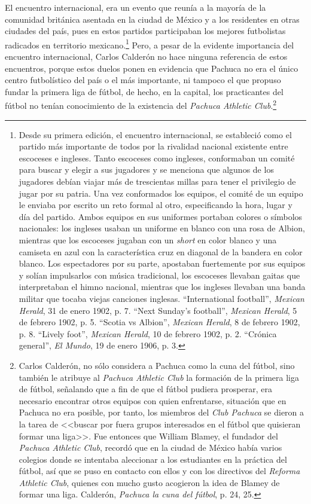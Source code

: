 \documentclass[11pt,a5paper,twoside]{book} %
\begin{document}
El encuentro internacional, era un evento que reunía a la mayoría de la comunidad británica asentada en la ciudad de México y a los residentes en otras ciudades del país, pues en estos partidos participaban los mejores futbolistas radicados en territorio mexicano.\footnote{Desde su primera edición, el encuentro internacional, se estableció como el partido más importante de todos por la rivalidad nacional existente entre escoceses e ingleses. Tanto escoceses como ingleses, conformaban un comité para buscar y elegir a sus jugadores y se menciona que algunos de los jugadores debían viajar más de trescientas millas para tener el privilegio de jugar por su patria. Una vez conformados los equipos, el comité de un equipo le enviaba por escrito un reto formal al otro, especificando la hora, lugar y día del partido. Ambos equipos en sus uniformes portaban colores o símbolos nacionales: los ingleses usaban un uniforme en blanco con una rosa de Albion, mientras que los escoceses jugaban con un \emph{short} en color blanco y una camiseta en azul con la característica cruz en diagonal de la bandera en color blanco. Los espectadores por su parte, apostaban fuertemente por sus equipos y solían impulsarlos con música tradicional, los escoceses llevaban gaitas que interpretaban el himno nacional, mientras que los ingleses llevaban una banda militar que tocaba viejas canciones inglesas. ``International football'', \emph{Mexican Herald}, 31 de enero 1902, p. 7. ``Next Sunday’s football'', \emph{Mexican Herald}, 5 de febrero 1902, p. 5. ``Scotia vs Albion'', \emph{Mexican Herald}, 8 de febrero 1902, p. 8. ``Lively foot'', \emph{Mexican Herald}, 10 de febrero 1902, p. 2. ``Crónica general'', \emph{El Mundo}, 19 de enero 1906, p. 3.} Pero, a pesar de la evidente importancia del encuentro internacional, Carlos Calderón no hace ninguna referencia de estos encuentros, porque estos duelos ponen en evidencia que Pachuca no era el único centro futbolístico del país o el más importante, ni tampoco el que propuso fundar la primera liga de fútbol, de hecho, en la capital, los practicantes del fútbol no tenían conocimiento de la existencia del \emph{Pachuca Athletic Club}.\footnote{Carlos Calderón, no sólo considera a Pachuca como la cuna del fútbol, sino también le atribuye al \emph{Pachuca Athletic Club} la formación de la primera liga de fútbol, señalando que a fin de que el fútbol pudiera prosperar, era necesario encontrar otros equipos con quien enfrentarse, situación que en Pachuca no era posible, por tanto, los miembros del \emph{Club Pachuca} se dieron a la tarea de <<buscar por fuera grupos interesados en el fútbol que quisieran formar una liga>>. Fue entonces que William Blamey, el fundador del \emph{Pachuca Athletic Club}, recordó que en la ciudad de México había varios colegios donde se intentaba aleccionar a los estudiantes en la práctica del fútbol, así que se puso en contacto con ellos y con los directivos del \emph{Reforma Athletic Club}, quienes con mucho gusto acogieron la idea de Blamey de formar una liga. Calderón, \emph{Pachuca la cuna del fútbol}, p. 24, 25.}
\end{document}
